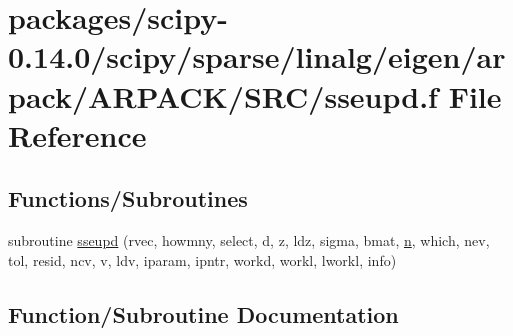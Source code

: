 \hypertarget{sseupd_8f}{}\section{packages/scipy-\/0.14.0/scipy/sparse/linalg/eigen/arpack/\+A\+R\+P\+A\+C\+K/\+S\+R\+C/sseupd.f File Reference}
\label{sseupd_8f}
\subsection*{Functions/\+Subroutines}
\begin{DoxyCompactItemize}
\item 
subroutine \hyperlink{sseupd_8f_a371430eb06da70bd34897252fa12f713}{sseupd} (rvec, howmny, select, d, z, ldz, sigma, bmat, \hyperlink{indexexpr_8h_ab427e2e2b4d6cec55fa088ea2a692ace}{n}, which, nev, tol, resid, ncv, v, ldv, iparam, ipntr, workd, workl, lworkl, info)
\end{DoxyCompactItemize}


\subsection{Function/\+Subroutine Documentation}
\hypertarget{sseupd_8f_a371430eb06da70bd34897252fa12f713}{}
